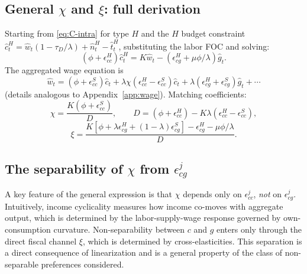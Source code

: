 \subsection{General $\chi$ and $\xi$: full derivation}\label{app:chi-xi-general}
Starting from \eqref{eq:C-intra} for type $H$ and the $H$ budget constraint
$\hat c^{H}_{t}=\hat w_{t}(1-\tau_{D}/\lambda)+\hat n^{H}_{t}-\hat t^{H}_{t}$,
substituting the labor FOC and solving:
\begin{equation}\label{eq:C-hmc-eq}
  (\phi+\epsilon^{H}_{cc})\hat c^{H}_{t}=K\hat w_{t}-(\epsilon^{H}_{cg}+\mu\phi/\lambda)\hat g_{t}.
\end{equation}
The aggregated wage equation is
\begin{equation}\label{eq:C-wage}
  \hat w_{t}=(\phi+\epsilon^{S}_{cc})\hat c_{t}+\lambda\chi(\epsilon^{H}_{cc}-\epsilon^{S}_{cc})\hat c_{t}
  +\lambda(\epsilon^{H}_{cg}+\epsilon^{S}_{cg})\hat g_{t}+\cdots
\end{equation}
(details analogous to Appendix~\ref{app:wage}). Matching coefficients:
\[
  \chi=\frac{K(\phi+\epsilon^{S}_{cc})}{D},\qquad
  D=(\phi+\epsilon^{H}_{cc})-K\lambda(\epsilon^{H}_{cc}-\epsilon^{S}_{cc}),
\]
\[
  \xi=\frac{K[\phi+\lambda\epsilon^{H}_{cg}+(1-\lambda)\epsilon^{S}_{cg}]-\epsilon^{H}_{cg}-\mu\phi/\lambda}{D}.
\]

\subsection{The separability of $\chi$ from $\epsilon^{j}_{cg}$}\label{app:chi-indep}
A key feature of the general expression is that $\chi$ depends only on
$\epsilon^{j}_{cc}$, \emph{not} on $\epsilon^{j}_{cg}$. Intuitively, income
cyclicality measures how \HtM{} income co-moves with aggregate output, which
is determined by the labor-supply-wage response governed by own-consumption
curvature. Non-separability between $c$ and $g$ enters only through the direct
fiscal channel $\xi$, which is determined by cross-elasticities. This
separation is a direct consequence of linearization and is a general property
of the class of non-separable preferences considered.
